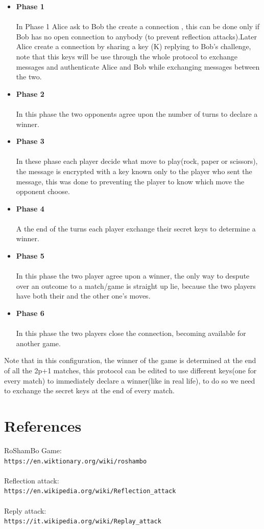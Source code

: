 \documentclass{article}
\begin{document}
\begin{itemize}
 \item \textbf{Phase 1}\\\\
 	In Phase 1 Alice ask to Bob the create a connection , this can be done only if Bob has no open connection to anybody (to prevent reflection attacks).Later Alice create a connection by sharing a key (K) replying 	to Bob's challenge, note that this keys will be use through the whole protocol to exchange messages and authenticate Alice and Bob while exchanging messages between the two. 
 	
	\item \textbf{Phase 2}\\\\
	In this phase the two opponents agree upon the number of turns to declare a winner.
		
	\item \textbf{Phase 3}\\\\
	In these phase each player decide what move to play(rock, paper or scissors), the message is encrypted with a key known only to the player who sent the message, this was done to preventing the player to 	know which move the opponent choose.
	
	\item \textbf{Phase 4}\\\\
	A the end of the turns each player exchange their secret keys to determine a winner.

	\item \textbf{Phase 5}\\\\
	In this phase the two player agree upon a winner, the only way to despute over an outcome to a match/game is straight up lie, because the two players have both their and the other one's moves.
		
	\item \textbf{Phase 6}\\\\
	In this phase the two players close the connection, becoming available for another game.

	\end{itemize}
	
Note that in this configuration, the winner of the game is determined at the end of all the 2p+1 matches, this protocol can be edited to use different keys(one for every match) to immediately declare a winner(like in real life), to do so we need to exchange the secret keys at the end of every match.

\clearpage

\section{References}

	RoShamBo Game:\\
	 \verb|https://en.wiktionary.org/wiki/roshambo|\\
	 \\Reflection attack:\\
	 \verb|https://en.wikipedia.org/wiki/Reflection_attack|\\
	\\Reply attack:\\
	 \verb|https://it.wikipedia.org/wiki/Replay_attack|\\
	
\end{document}
